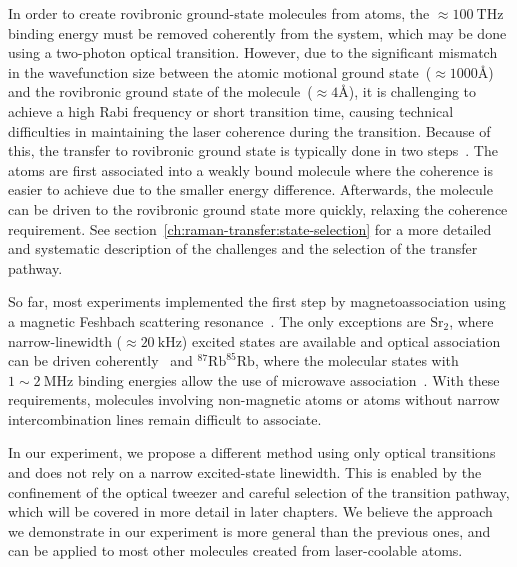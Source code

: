 In order to create rovibronic ground-state molecules from atoms,
the $\approx\!100~\mathrm{THz}$ binding energy must be removed coherently from the system,
which may be done using a two-photon optical transition.
However, due to the significant mismatch in the wavefunction size
between the atomic motional ground state~($\approx\!1000\text{\AA}$)
and the rovibronic ground state of the molecule~($\approx\!4\text{\AA}$),
it is challenging to achieve a high Rabi frequency or short transition time,
causing technical difficulties in maintaining the laser coherence during the transition.
Because of this, the transfer to rovibronic ground state is typically done in two steps~\cite{
  danzl_quantum_2008,ni_high_2008,lang_ultracold_2008,takekoshi_ultracold_2014,
  molony_creation_2014,park_ultracold_2015,guo_creation_2016,rvachov_long-lived_2017,
  kondov_molecular_2019,voges_ultracold_2020}.
The atoms are first associated into a weakly bound molecule
where the coherence is easier to achieve due to the smaller energy difference.
Afterwards, the molecule can be driven to the rovibronic ground state more quickly,
relaxing the coherence requirement. See section~\ref{ch:raman-transfer:state-selection}
for a more detailed and systematic description of the challenges
and the selection of the transfer pathway.

So far, most experiments implemented the first step
by magnetoassociation using a magnetic Feshbach scattering resonance~\cite{
  ni_high_2008,zhang_forming_2020}.
The only exceptions are $\mathrm{Sr}_2$,
where narrow-linewidth ($\approx\!20~\mathrm{kHz}$) excited states
are available and optical association can be driven coherently~\cite{
  reinaudi_optical_2012,stellmer_creation_2012}
and $^{87}\mathrm{Rb}^{85}\mathrm{Rb}$,
where the molecular states with $1\sim2~\mathrm{MHz}$ binding energies
allow the use of microwave association~\cite{he_coherently_2020}.
With these requirements, molecules involving non-magnetic atoms
or atoms without narrow intercombination lines remain difficult to associate.

In our experiment, we propose a different method using only optical transitions
and does not rely on a narrow excited-state linewidth.
This is enabled by the confinement of the optical tweezer and
careful selection of the transition pathway,
which will be covered in more detail in later chapters.
We believe the approach we demonstrate in our experiment is more general
than the previous ones,
and can be applied to most other molecules created from laser-coolable atoms.

